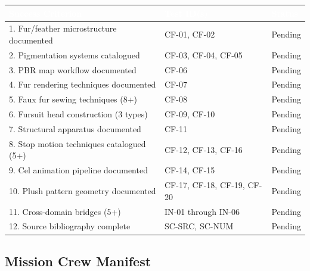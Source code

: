 \documentclass[11pt,letterpaper]{article}
\newcommand{\tableheader}[1]{\textbf{\sffamily\textcolor{white}{#1}}}
\begin{document}
\begin{center}
\begin{tabularx}{\textwidth}{XL{3.5cm}C{1.5cm}}
\toprule
{}
\tableheader{Success Criterion} & \tableheader{Test ID(s)} & \tableheader{Status} \\
. Fur/feather microstructure documented & CF-01, CF-02 & Pending \\
2. Pigmentation systems catalogued & CF-03, CF-04, CF-05 & Pending \\
3. PBR map workflow documented & CF-06 & Pending \\
4. Fur rendering techniques documented & CF-07 & Pending \\
5. Faux fur sewing techniques (8+) & CF-08 & Pending \\
6. Fursuit head construction (3 types) & CF-09, CF-10 & Pending \\
7. Structural apparatus documented & CF-11 & Pending \\
8. Stop motion techniques catalogued (5+) & CF-12, CF-13, CF-16 & Pending \\
9. Cel animation pipeline documented & CF-14, CF-15 & Pending \\
10. Plush pattern geometry documented & CF-17, CF-18, CF-19, CF-20 & Pending \\
11. Cross-domain bridges (5+) & IN-01 through IN-06 & Pending \\
12. Source bibliography complete & SC-SRC, SC-NUM & Pending \\
\bottomrule
\end{tabularx}
\end{center}

\subsection{Mission Crew Manifest}
\end{document}
